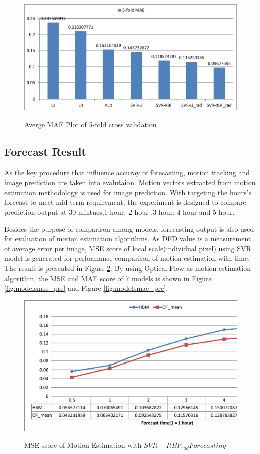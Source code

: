 \documentclass[conference]{IEEEtran}
\begin{document}
\begin{figure}[h]
\centering
\includegraphics[width=3 in]{modelsmae}
\label{fig:modelsmae}
\caption{Averge MAE Plot of 5-fold cross validation}
\end{figure}
 

\subsection{Forecast Result}
\label{subsec:forecast_e}
As the key procedure that influence accuray of forecasting, motion tracking and
image prediction are taken into evalutaion. Motion vectors extracted from motion
estimation methodology is used for image prediction. With targeting the hours's
forecast to meet mid-term requirement, the experiment is designed
to compare prediction output at 30 mintues,1 hour, 2 hour ,3 hour, 4
hour and 5 hour. 

Besides the purpose of comparison among models, forecasting output is also used
for evaluation of motion estimation algorithms. As DFD value is a measurement of
average error per image, MSE score of local scale(individual pixel) using SVR
model is generated for performance comparison of motion estimation with time.
The result is presented in Figure \ref{fig:mepred}. By using Optical Flow
as motion estimation algorithm, the MSE and MAE score of 7 models is shown in
Figure \ref{fig:modelsmse_pre} and Figure \ref{fig:modelsmae_pre}.

\begin{figure}[h]
\centering
\includegraphics[width=2.5 in]{mepred}
\label{fig:mepred}
\caption{MSE score of Motion Estimation with $SVR-RBF_{rad} Forecasting$}
\end{figure}
\end{document}
